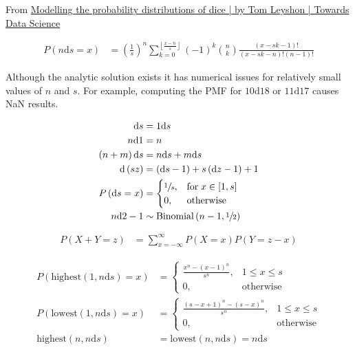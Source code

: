 \documentclass{article}
\newcommand\p[1]{\left( #1 \right)}
\renewcommand{\d}{\text{d}}
\begin{document}
From \href{https://towardsdatascience.com/modelling-the-probability-distributions-of-dice-b6ecf87b24ea}
{Modelling the probability distributions of dice | by Tom Leyshon | Towards Data Science}

\begin{align}
    P(n\d s=x) & =\p{\frac{1}{s}}^n\sum_{k=0}^{\left\lfloor \frac{x-n}{s}\right\rfloor}\p{-1}^k{n \choose k}\frac{\p{x-sk-1}!}{\p{x-sk-n}!\p{n-1}!}
\end{align}

Although the analytic solution exists it has numerical issues for relatively
small values of $n$ and $s$. For example, computing the PMF for $10\d 18$ or
$11\d 17$ causes NaN results.

\begin{align}
    \d s        & = 1\d s                                                  \\
    n\d 1       & = n                                                      \\
    \p{n+m}\d s & = n\d s + m\d s                                          \\
    \d \p{sz}   & = \p{\d s - 1} + s\p{\d z - 1} + 1                       \\
    P\p{\d s=x} & = \begin{cases}
                        \sfrac{1}{s}, & \text{for}\; x \in \left[ 1, s \right] \\
                        0,            & \text{otherwise}
                    \end{cases} \\
    n\d 2 - 1   & \sim \text{Binomial}\p{n-1, \sfrac{1}{2}}
\end{align}

\begin{align}
    P(X+Y=z) & =\sum_{x=-\infty }^{\infty }P(X=x)P(Y=z-x)
\end{align}

\begin{align}
    P\p{\text{highest}\p{1, n\d s}=x} & = \begin{cases}
                                              \frac{x^n-\p{x-1}^n}{s^n}, & 1\leq x\leq s    \\
                                              0,                         & \text{otherwise}
                                          \end{cases}                      \\
    P\p{\text{lowest}\p{1, n\d s}=x}  & = \begin{cases}
                                              \frac{\p{s-x+1}^n-\p{s-x}^n}{s^n}, & 1\leq x\leq s    \\
                                              0,                                 & \text{otherwise}
                                          \end{cases} \\
    \text{highest}\p{n, n\d s}        & = \text{lowest}\p{n, n\d s} = n\d s
\end{align}
\end{document}
